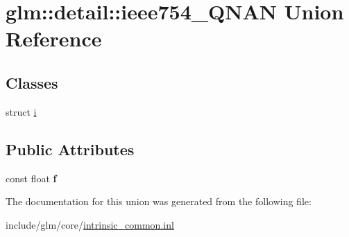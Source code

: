 \hypertarget{unionglm_1_1detail_1_1ieee754__QNAN}{\section{glm\-:\-:detail\-:\-:ieee754\-\_\-\-Q\-N\-A\-N \-Union \-Reference}
\label{unionglm_1_1detail_1_1ieee754__QNAN}
}
\subsection*{\-Classes}
\begin{DoxyCompactItemize}
\item 
struct \hyperlink{structglm_1_1detail_1_1ieee754__QNAN_1_1i}{i}
\end{DoxyCompactItemize}
\subsection*{\-Public \-Attributes}
\begin{DoxyCompactItemize}
\item 
\hypertarget{unionglm_1_1detail_1_1ieee754__QNAN_ac5f04f4e605e4d08ddc2bacddf7eee65}{const float {\bfseries f}}\label{unionglm_1_1detail_1_1ieee754__QNAN_ac5f04f4e605e4d08ddc2bacddf7eee65}

\end{DoxyCompactItemize}


\-The documentation for this union was generated from the following file\-:\begin{DoxyCompactItemize}
\item 
include/glm/core/\hyperlink{intrinsic__common_8inl}{intrinsic\-\_\-common.\-inl}\end{DoxyCompactItemize}
